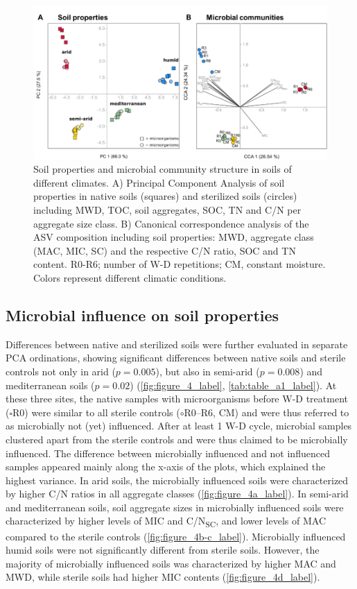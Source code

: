 \begin{figure}[H]
	\centering
	\includegraphics[width=1\textwidth]{img/M4-Figure_3.png}
	\caption{Soil properties and microbial community structure in soils of different climates. A) Principal Component Analysis of soil properties in native soils (squares) and sterilized soils (circles) including MWD, TOC, soil aggregates, SOC, TN and C/N per aggregate size class. B) Canonical correspondence analysis of the ASV composition including soil properties: MWD, aggregate class (MAC, MIC, SC) and the respective C/N ratio, SOC and TN content. R0-R6; number of W-D repetitions; CM, constant moisture. Colors represent different climatic conditions.}
	\label{fig:M4-F3}
\end{figure}


\subsection{Microbial influence on soil properties}

Differences between native and sterilized soils were further evaluated in separate PCA ordinations, showing significant differences between native soils and sterile controls not only in arid (\(p = 0.005\)), but also in semi-arid (\(p = 0.008\)) and mediterranean soils (\(p = 0.02\)) (\cref{fig:figure_4_label}, \cref{tab:table_a1_label}). 
At these three sites, the native samples with microorganisms before W-D treatment (\(\square\)R0) were similar to all sterile controls (\(\circ\)R0--R6, CM) and were thus referred to as microbially not (yet) influenced. 
After at least 1 W-D cycle, microbial samples clustered apart from the sterile controls and were thus claimed to be microbially influenced. 
The difference between microbially influenced and not influenced samples appeared mainly along the x-axis of the plots, which explained the highest variance. 
In arid soils, the microbially influenced soils were characterized by higher C/N ratios in all aggregate classes (\cref{fig:figure_4a_label}). 
In semi-arid and mediterranean soils, soil aggregate sizes in microbially influenced soils were characterized by higher levels of MIC and C/N\textsubscript{SC}, and lower levels of MAC compared to the sterile controls (\cref{fig:figure_4b-c_label}). 
Microbially influenced humid soils were not significantly different from sterile soils. 
However, the majority of microbially influenced soils was characterized by higher MAC and MWD, while sterile soils had higher MIC contents (\cref{fig:figure_4d_label}).

